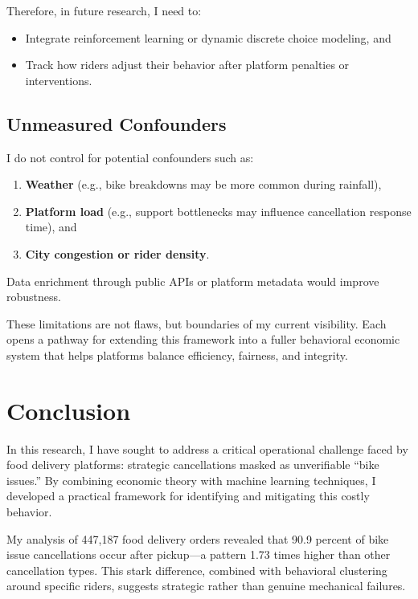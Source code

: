 \documentclass[12pt,letterpaper]{article}
\begin{document}
Therefore, in future research, I need to:
\begin{itemize}
    \item Integrate reinforcement learning or dynamic discrete choice modeling, and
    \item Track how riders adjust their behavior after platform penalties or interventions.
\end{itemize}

\subsection{Unmeasured Confounders}

I do not control for potential confounders such as:
\begin{enumerate}
    \item \textbf{Weather} (e.g., bike breakdowns may be more common during rainfall),
    \item \textbf{Platform load} (e.g., support bottlenecks may influence cancellation response time), and
    \item \textbf{City congestion or rider density}.
\end{enumerate}

Data enrichment through public APIs or platform metadata would improve robustness.

These limitations are not flaws, but boundaries of my current visibility. Each opens a pathway for extending this framework into a fuller behavioral economic system that helps platforms balance efficiency, fairness, and integrity.

\section{Conclusion}

In this research, I have sought to address a critical operational challenge faced by food delivery platforms: strategic cancellations masked as unverifiable ``bike issues.'' By combining economic theory with machine learning techniques, I developed a practical framework for identifying and mitigating this costly behavior.

My analysis of 447,187 food delivery orders revealed that 90.9 percent of bike issue cancellations occur after pickup—a pattern 1.73 times higher than other cancellation types. This stark difference, combined with behavioral clustering around specific riders, suggests strategic rather than genuine mechanical failures.
\end{document}
